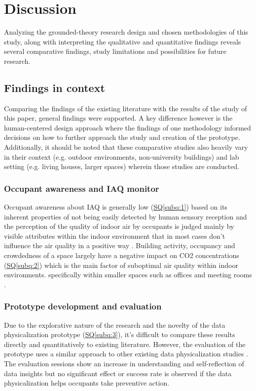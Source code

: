 \section{Discussion}
\label{sec:discussion}

Analyzing the grounded-theory research design and chosen methodologies of this study, along with interpreting the qualitative and quantitative findings reveals several comparative findings, study limitations and possibilities for future research.


\subsection{Findings in context}
Comparing the findings of the existing literature with the results of the study of this paper, general findings were supported. A key difference however is the human-centered design approach where the findings of one methodology informed decisions on how to further approach the study and creation of the prototype. Additionally, it should be noted that these comparative studies also heavily vary in their context (e.g. outdoor environments, non-university buildings) and lab setting (e.g. living houses, larger spaces) wherein those studies are conducted.

\subsubsection{Occupant awareness and IAQ monitor}
Occupant awareness about IAQ is generally low (\hyperref[subq:1]{SQ\ref*{subq:1}}) based on its inherent properties of not being easily detected by human sensory reception and the perception of the quality of indoor air by occupants is judged mainly by visible attributes within the indoor environment that in most cases don't influence the air quality in a positive way \cite{schweizer_indoor_2007} \cite{corlan_importance_2021}. Building activity, occupancy and crowdedness of a space largely have a negative impact on CO2 concentrations (\hyperref[subq:2]{SQ\ref*{subq:2}}) which is the main factor of suboptimal air quality within indoor environments. \cite{fromme_indoor_2023} \cite{du_indoor_2020} specifically within smaller spaces such as offices and meeting rooms \cite{zhong_complexity_2021}. 

\subsubsection{Prototype development and evaluation}
Due to the explorative nature of the research and the novelty of the data physicalization prototype (\hyperref[subq:3]{SQ\ref*{subq:3}}), it's difficult to compare these results directly and quantitatively to existing literature. However, the evaluation of the prototype uses a similar approach to other existing data physicalization studies \cite{alexander_data_2019, jansen_opportunities_2015}. The evaluation sessions show an increase in understanding and self-reflection of data insights but no significant effect or success rate is observed if the data physicalization helps occupants take preventive action. 

